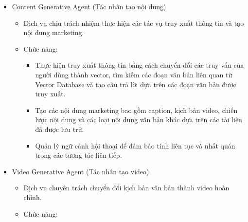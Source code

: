\begin{itemize}
\begin{itemize}
    \begin{itemize}
    \item
      Tiếp nhận tài liệu từ Main Service và thực hiện quá trình trích
      xuất văn bản từ các định dạng khác nhau (PDF, Word, Text, URL).
    \item
      Thực hiện phân đoạn văn bản (chunking) và tạo các vector embedding
      từ các đoạn văn bản.
    \item
      Lưu trữ các vector embedding vào Vector Database và lưu trữ
      metadata tài liệu vào Relational Database.
    \item
      Cung cấp thông tin trạng thái xử lý tài liệu để Main Service có
      thể theo dõi và thông báo cho người dùng.
    \end{itemize}
  \end{itemize}
\item
  Content Generative Agent (Tác nhân tạo nội dung)

  \begin{itemize}
  \item
    Dịch vụ chịu trách nhiệm thực hiện các tác vụ truy xuất thông tin và
    tạo nội dung marketing.
  \item
    Chức năng:

    \begin{itemize}
    \item
      Thực hiện truy xuất thông tin bằng cách chuyển đổi các truy vấn
      của người dùng thành vector, tìm kiếm các đoạn văn bản liên quan
      từ Vector Database và tạo câu trả lời dựa trên các đoạn văn bản
      được truy xuất.
    \item
      Tạo các nội dung marketing bao gồm caption, kịch bản video, chiến
      lược nội dung và các loại nội dung văn bản khác dựa trên các tài
      liệu đã được lưu trữ.
    \item
      Quản lý ngữ cảnh hội thoại để đảm bảo tính liên tục và nhất quán
      trong các tương tác liên tiếp.
    \end{itemize}
  \end{itemize}
\item
  Video Generative Agent (Tác nhân tạo video)

  \begin{itemize}
  \item
    Dịch vụ chuyên trách chuyển đổi kịch bản văn bản thành video hoàn
    chỉnh.
  \item
    Chức năng:


\end{itemize}
\end{itemize}
